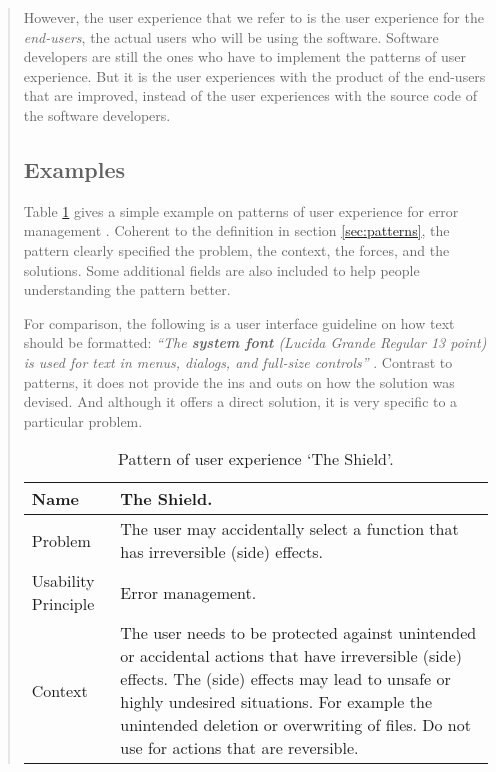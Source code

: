 \documentclass[a4paper,titlepage]{article}
\begin{document}
\begin{quote}
However, the user experience that we refer to is the user experience
for the \textit{end-users}, the actual users who will be using the
software. Software developers are still the ones who have to implement
the patterns of user experience. But it is the user experiences with
the product of the end-users that are improved, instead of the user
experiences with the source code of the software developers.

\subsection{Examples}
Table \ref{tab:shield} gives a simple example on patterns of user
experience for error management \citep{patterns:welie}. Coherent to
the definition in section \ref{sec:patterns}, the pattern clearly
specified the problem, the context, the forces, and the
solutions. Some additional fields are also included to help people
understanding the pattern better.

For comparison, the following is a user interface guideline on how
text should be formatted: \textit{``The \textbf{system font} (Lucida
  Grande Regular 13 point) is used for text in menus, dialogs, and
  full-size controls''} \citep{hig:apple}. Contrast to patterns, it
does not provide the ins and outs on how the solution was devised. And
although it offers a direct solution, it is very specific to a
particular problem.

\begin{table}[!t]
  \caption{Pattern of user experience `The Shield'.}
  \label{tab:shield}
  \begin{center}
    \begin{tabular}{| p{} || p{} |}
      \hline
      Name & The Shield. \\ \hline

      Problem & The user may accidentally select a function that has
      irreversible (side) effects. \\ \hline

      Usability Principle & Error management. \\ \hline

      Context & The user needs to be protected against unintended or
      accidental actions that have irreversible (side) effects. The
      (side) effects may lead to unsafe or highly undesired
      situations. For example the unintended deletion or overwriting
      of files. Do not use for actions that are reversible. \\ \hline


\end{tabular}
\end{center}
\end{table}
\end{quote}
\end{document}
